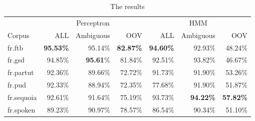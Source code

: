 \documentclass{article}
\begin{document}
\begin{table}[h]
\caption{The results}
\vspace{5pt}
\centering
    
\begin{tabular}{|l|rrr|rrr|}
\hline
\multicolumn{1}{|c|}{\ } & \multicolumn{3}{c|}{Perceptron} & \multicolumn{3}{c|}{HMM}\\ 
\cline{2-7}
Corpus & ALL & Ambiguous & OOV & ALL & Ambiguous & OOV\\
\hline
fr.ftb     & \textbf{95.53\%} & 95.14\% & \textbf{82.87\%} & \textbf{94.60\%} & 92.93\% & 48.24\% \\
fr.gsd     & 94.85\% & \textbf{95.61}\% & 81.84\% & 92.51\% & 93.82\% & 46.67\% \\
fr.partut  & 92.36\% & 89.66\% & 72.72\% & 91.73\% & 91.90\% & 53.26\% \\
fr.pud     & 92.33\% & 88.94\% & 72.35\% & 77.68\% & 91.90\% & 51.87\% \\
fr.sequoia & 92.61\% & 91.64\% & 75.19\% & 93.73\% & \textbf{94.22\%} & \textbf{57.82\%} \\
fr.spoken  & 89.23\% & 90.97\% & 78.57\% & 86.54\% & 90.34\% & 51.10\% \\
\hline
\end{tabular}
\end{table}

 
% 

\end{document}
